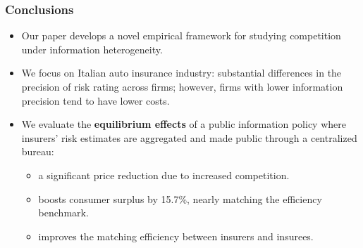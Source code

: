\documentclass[10pt,aspectratio=169]{beamer}
\begin{document}
\begin{frame}
\frametitle{Conclusions}
    \begin{itemize}
        \item Our paper develops a novel empirical framework for studying competition under information heterogeneity.
        
        \medskip
        \item We focus on Italian auto insurance industry: substantial differences in the precision of risk rating across firms; however, firms with lower information precision tend to have lower costs.
        
        \medskip
        \item We evaluate the \textbf{equilibrium effects} of a public information policy where insurers' risk estimates are aggregated and made public through a centralized bureau:
        \begin{itemize}
            \item a significant price reduction due to increased competition.
            \item boosts consumer surplus by 15.7\%, nearly matching the efficiency benchmark.
            \item improves the matching efficiency between insurers and insurees.
        \end{itemize}
    \end{itemize}
\end{frame}
\end{document}
